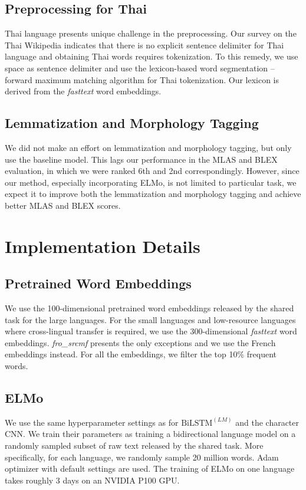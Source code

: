 \documentclass[11pt,a4paper]{article}
\begin{document}
\subsection{Preprocessing for Thai}

Thai language presents unique challenge in the preprocessing.
Our survey on the Thai Wikipedia indicates that there is no explicit sentence delimiter for Thai language
and obtaining Thai words requires tokenization.
To this remedy, we use space as sentence delimiter and
use the lexicon-based word segmentation -- forward maximum matching algorithm
for Thai tokenization.
Our lexicon is derived from the \textit{fasttext} word embeddings.

\subsection{Lemmatization and Morphology Tagging}
We did not make an effort on lemmatization and morphology tagging,
but only use the baseline model.
This lags our performance in the MLAS and BLEX evaluation,
in which we were ranked 6th and 2nd correspondingly.
However, since our method, especially incorporating ELMo, is not limited to particular task,
we expect it to improve both the lemmatization and morphology tagging and
achieve better MLAS and BLEX scores.

\section{Implementation Details}

\subsection{Pretrained Word Embeddings}
We use the 100-dimensional pretrained word embeddings released by the shared task
for the large languages.
For the small languages and low-resource languages where cross-lingual transfer is required,
we use the 300-dimensional \textit{fasttext} word embeddings.
\textit{fro\_srcmf} presents the only exceptions and we use the French embeddings instead.
For all the embeddings, we filter the top 10\% frequent words.

\subsection{ELMo}
We use the same hyperparameter settings as \citet{N18-1202} for $\text{BiLSTM}^{(LM)}$
and the character CNN.
We train their parameters
as training a bidirectional language model
on a randomly sampled subset of raw text released by the shared task.
More specifically, for each language, we randomly sample 20 million words.
Adam optimizer \cite{DBLP:journals/corr/KingmaB14} with default settings are used.
The training of ELMo on one language takes roughly 3 days on an NVIDIA P100 GPU.
\end{document}
